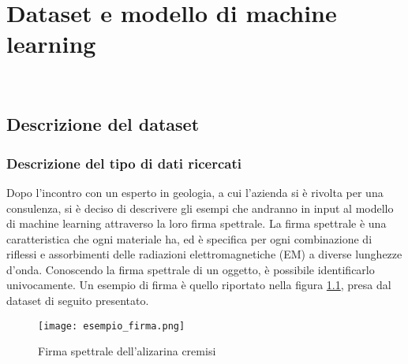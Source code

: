 
\chapter{Dataset e modello di machine learning}
\label{cap:machine-learning}

\\

\section{Descrizione del dataset}
\subsection{Descrizione del tipo di dati ricercati}
Dopo l'incontro con un esperto in geologia, a cui l'azienda si è rivolta per una consulenza, si è deciso di descrivere gli esempi che andranno in input al modello di machine learning attraverso la loro firma spettrale.
La firma spettrale è una caratteristica che ogni materiale ha, ed è specifica per ogni combinazione di riflessi e assorbimenti delle radiazioni elettromagnetiche (EM) a diverse lunghezze d'onda. Conoscendo la firma spettrale di un oggetto, è possibile identificarlo univocamente.
Un esempio di firma è quello riportato nella figura \ref*{esempio_firma}, presa dal dataset di seguito presentato.
\begin{figure}
    \centering
    \texttt{[image: esempio\_firma.png]}
    \caption{Firma spettrale dell'alizarina cremisi}
    \label{esempio_firma}
\end{figure}

